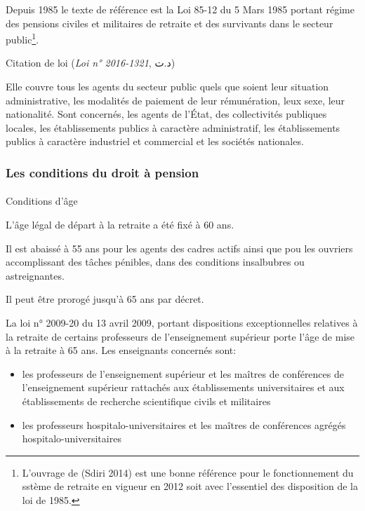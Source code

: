 \documentclass[
  letterpaper,
  DIV=11,
  numbers=noendperiod]{scrreprt}
\makeatletter
\let\oldparagraph\paragraph
\renewcommand{\paragraph}{
    \@ifstar
      \xxxParagraphStar
      \xxxParagraphNoStar
  }
\newcommand{\xxxParagraphStar}[1]{\oldparagraph*{#1}\mbox{}}
\newcommand{\xxxParagraphNoStar}[1]{\oldparagraph{#1}\mbox{}}
\makeatother
\begin{document}
Depuis 1985 le texte de référence est la Loi 85-12 du 5 Mars 1985
portant régime des pensions civiles et militaires de retraite et des
survivants dans le secteur public\footnote{L'ouvrage de (Sdiri 2014) est
  une bonne référence pour le fonctionnement du sstème de retraite en
  vigueur en 2012 soit avec l'essentiel des disposition de la loi de
  1985.}.

Citation de loi (\emph{Loi n° 2016-1321}, د.ت)

Elle couvre tous les agents du secteur public quels que soient leur
situation administrative, les modalités de paiement de leur
rémunération, leux sexe, leur nationalité. Sont concernés, les agents de
l'État, des collectivités publiques locales, les établissements publics
à caractère administratif, les établissements publics à caractère
industriel et commercial et les sociétés nationales.

\subsubsection{Les conditions du droit à
pension}\label{les-conditions-du-droit-uxe0-pension}

\paragraph{Conditions d'âge}\label{conditions-duxe2ge}

L'âge légal de départ à la retraite a été fixé à 60 ans.

Il est abaissé à 55 ans pour les agents des cadres actifs ainsi que pou
les ouvriers accomplissant des tâches pénibles, dans des conditions
insalbubres ou astreignantes.

Il peut être prorogé jusqu'à 65 ans par décret.

La loi n° 2009-20 du 13 avril 2009, portant dispositions exceptionnelles
relatives à la retraite de certains professeurs de l'enseignement
supérieur porte l'âge de mise à la retraite à 65 ans. Les enseignants
concernés sont:

\begin{itemize}
\item
  les professeurs de l'enseignement supérieur et les maîtres de
  conférences de l'enseignement supérieur rattachés aux établissements
  universitaires et aux établissements de recherche scientifique civils
  et militaires
\item
  les professeurs hospitalo-universitaires et les maîtres de conférences
  agrégés hospitalo-universitaires
\end{itemize}
\end{document}
